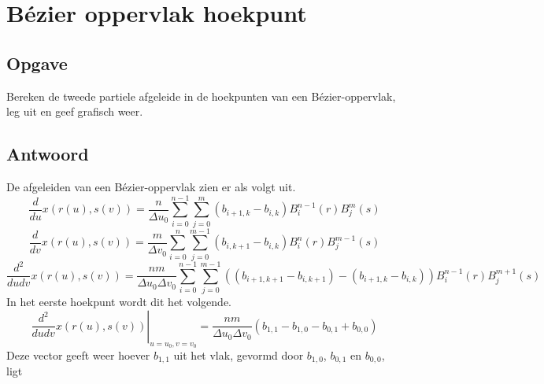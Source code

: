 \documentclass[examenvragen.tex]{subfiles}
\begin{document}
\section{B\'ezier oppervlak hoekpunt}
\subsection{Opgave}
Bereken de tweede partiele afgeleide in de hoekpunten van een B\'ezier-oppervlak, leg uit en geef grafisch weer.

\subsection{Antwoord}
De afgeleiden van een B\'ezier-oppervlak zien er als volgt uit.
\[
\frac{d}{du}x(r(u),s(v)) = \frac{n}{\Delta u_0}\sum_{i=0}^{n-1}\sum_{j=0}^{m}(b_{i+1,k}-b_{i,k})B_{i}^{n-1}(r)B_{j}^{m}(s)
\]
\[
\frac{d}{dv}x(r(u),s(v)) = \frac{m}{\Delta v_0}\sum_{i=0}^{n}\sum_{j=0}^{m-1}(b_{i,k+1}-b_{i,k})B_{i}^{n}(r)B_{j}^{m-1}(s)
\]
\[
\frac{d^2}{dudv}x(r(u),s(v)) = \frac{nm}{\Delta u_0\Delta v_0}\sum_{i=0}^{n-1}\sum_{j=0}^{m-1}\left((b_{i+1,k+1}-b_{i,k+1})-(b_{i+1,k}-b_{i,k})\right)B_{i}^{n-1}(r)B_{j}^{m+1}(s)
\]
In het eerste hoekpunt wordt dit het volgende.
\[
\left.\frac{d^2}{dudv}x(r(u),s(v))\right|_{u=u_{0},v=v_{0}} = \frac{nm}{\Delta u_0 \Delta v_0}(b_{1,1}-b_{1,0}-b_{0,1}+b_{0,0})
\]
Deze vector geeft weer hoever $b_{1,1}$ uit het vlak, gevormd door $b_{1,0}$, $b_{0,1}$ en $b_{0,0}$, ligt
\end{document}
